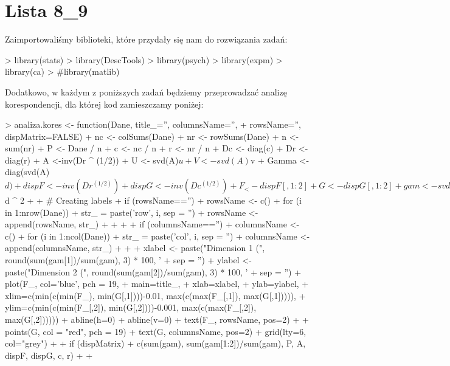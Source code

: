 \documentclass[12pt]{mwart}
\begin{document}
\section{Lista 8\_9}
Zaimportowaliśmy biblioteki, które przydały się nam do rozwiązania zadań:
\begin{Schunk}
\begin{Sinput}
> library(stats)
> library(DescTools)
> library(psych)
> library(expm)
> library(ca)
> #library(matlib)
\end{Sinput}
\end{Schunk}
Dodatkowo, w każdym z poniższych zadań będziemy przeprowadzać analizę korespondencji,
dla której kod zamieszczamy poniżej:
\begin{Schunk}
\begin{Sinput}
> analiza.kores <- function(Dane, title_='', columnsName='', 
+                           rowsName='', dispMatrix=FALSE) {
+   nc <-  colSums(Dane)
+   nr <- rowSums(Dane)
+   n <- sum(nr)
+   P <- Dane / n
+   c <- nc / n
+   r <- nr / n
+   Dc <- diag(c)
+   Dr <- diag(r)
+   A <-inv(Dr ^ (1/2)) %*% (P- r %*% t(c)) %*% inv(Dc ^ (1/2))
+   U <-  svd(A)$u
+   V <-  svd(A)$v
+   Gamma <-  diag(svd(A)$d)
+   dispF <- inv(Dr^(1/2)) %*% U %*% Gamma
+   dispG <- inv(Dc^(1/2)) %*% V %*% Gamma
+   F_ <- dispF[,1:2] 
+   G <- dispG[,1:2]
+   gam <- svd(A)$d ^ 2
+ 
+   # Creating labels
+   if (rowsName=='') {
+     rowsName <- c()
+     for (i in 1:nrow(Dane)) {
+       str_ = paste('row', i, sep = '')
+       rowsName <- append(rowsName, str_)
+     }
+   }
+   
+   if (columnsName=='') {
+     columnsName <- c()
+     for (i in 1:ncol(Dane)) {
+       str_ = paste('col', i, sep = '')
+       columnsName <- append(columnsName, str_)
+     }
+   }
+   xlabel <- paste("Dimension 1 (", round(sum(gam[1])/sum(gam), 3) * 100, '%)', 
+                   sep = '')
+   ylabel <- paste("Dimension 2 (", round(sum(gam[2])/sum(gam), 3) * 100, '%)', 
+                   sep = '')
+   plot(F_, col='blue', pch = 19,
+        main=title_,
+        xlab=xlabel,
+        ylab=ylabel,
+        xlim=c(min(c(min(F_), min(G[,1])))-0.01, max(c(max(F_[,1]), max(G[,1])))),
+        ylim=c(min(c(min(F_[,2]), min(G[,2])))-0.001, max(c(max(F_[,2]), max(G[,2])))))
+   abline(h=0)
+   abline(v=0)
+   text(F_, rowsName, pos=2)
+   
+   points(G, col = "red", pch = 19)
+   text(G, columnsName, pos=2)
+   grid(lty=6, col="grey")
+   
+   if (dispMatrix) {
+     c(sum(gam), sum(gam[1:2])/sum(gam), P, A, dispF, dispG, c, r)
+   }
+ }
\end{Sinput}
\end{Schunk}
\end{document}
